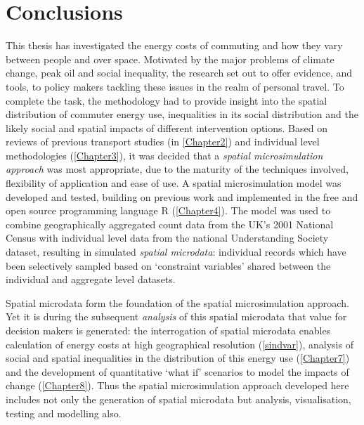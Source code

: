 
\chapter{Conclusions} %
\label{Chapter9}
\fancyhead[RE,LO]{\thepage}
This thesis has investigated the energy costs of commuting and how they vary
between people and over space.
Motivated by the major problems of climate change, peak oil and
social inequality, the research set out to offer
evidence, and tools, to policy makers tackling these issues in the realm
of personal travel.
To complete the task, the methodology had to provide insight into the
spatial distribution of commuter energy use,
inequalities in its social distribution and the likely social and spatial
impacts of different intervention options.
Based on reviews of previous transport studies (in \cref{Chapter2})
and individual level methodologies (\cref{Chapter3}), it was decided that
a \emph{spatial microsimulation approach} was most appropriate,
due to the maturity of the techniques involved, flexibility of application and
ease of use.
A spatial microsimulation model was developed and tested, building on previous
work and implemented in the free and open source programming
language R (\cref{Chapter4}). The model
was used to combine geographically aggregated count data from the UK's 2001 National Census
with individual level data from the national Understanding Society dataset,
resulting in simulated \emph{spatial microdata}: individual
records which have been selectively sampled based on `constraint variables' shared
between the individual and aggregate level datasets.

Spatial microdata form the foundation of the spatial microsimulation approach.
Yet it is during the subsequent \emph{analysis} of this spatial microdata that
value for decision makers is generated: the interrogation of spatial microdata enables
calculation of energy costs at high geographical resolution (\cref{sindvar}),
analysis of social and spatial inequalities in the distribution of this energy
use (\cref{Chapter7}) and the development of quantitative
`what if' scenarios to model the impacts of change (\cref{Chapter8}).
Thus the spatial microsimulation approach developed here
includes not only the generation of spatial microdata but
analysis, visualisation, testing and modelling also.

